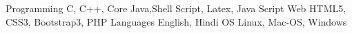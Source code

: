 \begin{cvhonors}
  \cvhonor
    {Programming }
    {C, C++, Core Java,Shell Script, Latex, Java Script}
    {}
    {}
  \cvhonor
    {Web \hspace{1.3cm} }
    {HTML5, CSS3, Bootstrap3, PHP}
    {}
    {}
    \cvhonor
    {Languages  \hspace{0.4cm}}
    {English, Hindi}
    {}
    {}
    \cvhonor
    {OS  \hspace{1.4cm}}
    {Linux, Mac-OS, Windows}
    {}
    {}
    \end{cvhonors}
    